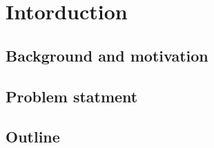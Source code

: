 
\chapter{Intorduction}

\section{Background and motivation}
\section{Problem statment}
\section{Outline}